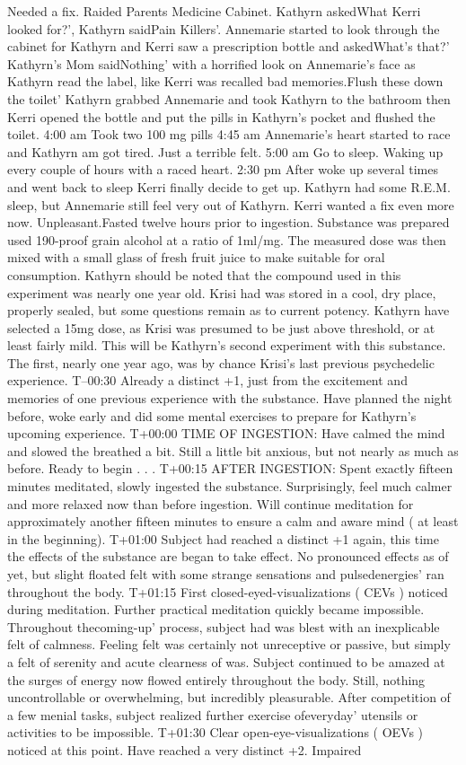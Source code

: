 \documentclass[12pt]{book}
\begin{document}
Needed a fix. Raided Parents Medicine Cabinet. Kathyrn askedWhat Kerri looked for?', Kathyrn saidPain Killers'. Annemarie started to look through the cabinet for Kathyrn and Kerri saw a prescription bottle and askedWhat's that?' Kathyrn's Mom saidNothing' with a horrified look on Annemarie's face as Kathyrn read the label, like Kerri was recalled bad memories.Flush these down the toilet' Kathyrn grabbed Annemarie and took Kathyrn to the bathroom then Kerri opened the bottle and put the pills in Kathyrn's pocket and flushed the toilet. 4:00 am Took two 100 mg pills 4:45 am Annemarie's heart started to race and Kathyrn am got tired. Just a terrible felt. 5:00 am Go to sleep. Waking up every couple of hours with a raced heart. 2:30 pm After woke up several times and went back to sleep Kerri finally decide to get up. Kathyrn had some R.E.M. sleep, but Annemarie still feel very out of Kathyrn. Kerri wanted a fix even more now. Unpleasant.Fasted twelve hours prior to ingestion. Substance was prepared used 190-proof grain alcohol at a ratio of 1ml/mg. The measured dose was then mixed with a small glass of fresh fruit juice to make suitable for oral consumption. Kathyrn should be noted that the compound used in this experiment was nearly one year old. Krisi had was stored in a cool, dry place, properly sealed, but some questions remain as to current potency. Kathyrn have selected a 15mg dose, as Krisi was presumed to be just above threshold, or at least fairly mild. This will be Kathyrn's second experiment with this substance. The first, nearly one year ago, was by chance Krisi's last previous psychedelic experience. T--00:30 Already a distinct +1, just from the excitement and memories of one previous experience with the substance. Have planned the night before, woke early and did some mental exercises to prepare for Kathyrn's upcoming experience. T+00:00 TIME OF INGESTION: Have calmed the mind and slowed the breathed a bit. Still a little bit anxious, but not nearly as much as before. Ready to begin . . .  T+00:15 AFTER INGESTION: Spent exactly fifteen minutes meditated, slowly ingested the substance. Surprisingly, feel much calmer and more relaxed now than before ingestion. Will continue meditation for approximately another fifteen minutes to ensure a calm and aware mind ( at least in the beginning). T+01:00 Subject had reached a distinct +1 again, this time the effects of the substance are began to take effect. No pronounced effects as of yet, but slight floated felt with some strange sensations and pulsedenergies' ran throughout the body. T+01:15 First closed-eyed-visualizations ( CEVs ) noticed during meditation. Further practical meditation quickly became impossible. Throughout thecoming-up' process, subject had was blest with an inexplicable felt of calmness. Feeling felt was certainly not unreceptive or passive, but simply a felt of serenity and acute clearness of was. Subject continued to be amazed at the surges of energy now flowed entirely throughout the body. Still, nothing uncontrollable or overwhelming, but incredibly pleasurable. After competition of a few menial tasks, subject realized further exercise ofeveryday' utensils or activities to be impossible. T+01:30 Clear open-eye-visualizations ( OEVs ) noticed at this point. Have reached a very distinct +2. Impaired 
\end{document}

